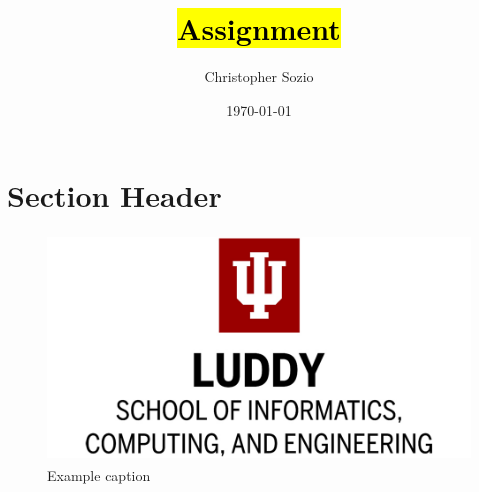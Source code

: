 \documentclass{article}
\title{\hl{Assignment}}
\author{Christopher Sozio}
\date{\today}
\begin{document}
\maketitle

\thispagestyle{fancy}

\section{Section Header}

\begin{figure}[H]
\centering
\includegraphics[width=12cm,height=6cm]{images/luddy.jpg}
\caption{\label{fig:example}Example caption}
\end{figure}

\printbibliography
\end{document}
